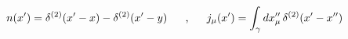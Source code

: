 \begin{equation}
n(x')=\delta^{(2)}(x'-x)-\delta^{(2)}(x'-y)\makebox[.5in]{,}
j_{\mu }(x')=\int_{\gamma }dx_\mu''\,\delta ^{(2)}(x'-x'')
\end{equation}

